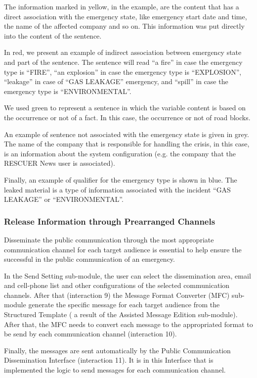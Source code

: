 The information marked in yellow, in the example, are the content that has a direct association with the emergency state, like emergency start date and time, the name of the affected company and so on. This information was put directly into the content of the sentence.

In red, we present an example of indirect association between emergency state and part of the sentence. The sentence will read ``a fire'' in case the emergency type is ``FIRE'', ``an explosion'' in case the emergency type is ``EXPLOSION'', ``leakage'' in case of ``GAS LEAKAGE'' emergency, and ``spill'' in case the emergency type is ``ENVIRONMENTAL''. 

We used green to represent a sentence in which the variable content is based on the occurrence or not of a fact. In this case, the occurrence or not of road blocks. 

An example of sentence not associated with the emergency state is given in grey. The name of the company that is responsible for handling the crisis, in this case, is an information about the system configuration (e.g. the company that the RESCUER News user is associated).

Finally, an example of qualifier for the emergency type is shown in blue. The leaked material is a type of information associated with the incident ``GAS LEAKAGE'' or ``ENVIRONMENTAL''.

\subsubsection{Release Information through Prearranged Channels}

Disseminate the public communication through the most appropriate communication channel for each target audience is essential to help ensure the successful in the public communication of an emergency.

In the Send Setting sub-module, the user can select the dissemination area, email and cell-phone list and other configurations of the selected communication channels. After that (interaction 9) the Message Format Converter (MFC) sub-module generate the specific message for each target audience from the Structured Template ( a result of the Assisted Message Edition sub-module).  After that, the MFC needs to convert each message to the appropriated format to be send by each communication channel (interaction 10). 

Finally, the messages are sent automatically by the Public Communication Dissemination Interface (interaction 11). It is in this Interface that is implemented the logic to send messages for each communication channel. 

